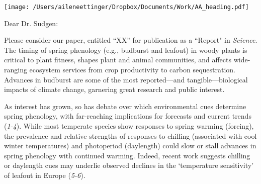 \documentclass[11pt,a4paper]{letter}
\begin{document}

\begin{letter}{}
\texttt{[image: /Users/aileneettinger/Dropbox/Documents/Work/AA\_heading.pdf]}

\opening{Dear Dr. Sudgen:}
Please consider our paper, entitled ``XX'' for publication as a ``Report" in \emph{Science}. 
The timing of spring phenology (e.g., budburst and leafout) in woody plants is critical to plant fitness, shapes plant and animal communities, and affects wide-ranging ecosystem services from crop productivity to carbon sequestration. %
Advances in budburst are some of the most reported---and tangible---biological impacts of climate change, garnering great research and public interest. 

\par As interest has grown, so has debate over which environmental cues determine spring phenology, with far-reaching implications for forecasts and current trends  (\emph{1-4}). While most temperate species show responses to spring warming (forcing), the prevalence and relative strengths of responses to chilling (associated with cool winter temperatures) and photoperiod (daylength) could slow or stall advances in spring phenology with continued warming. Indeed, recent work suggests chilling or daylength cues may underlie observed declines in the `temperature sensitivity' of leafout in Europe (\emph{5-6}). 


\end{letter}
\end{document}
